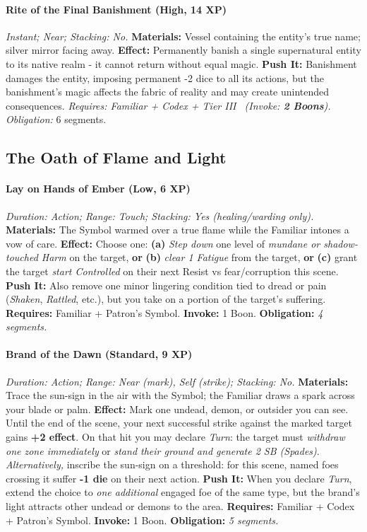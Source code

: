 \paragraph{Rite of the Final Banishment (High, 14 XP)} \emph{Instant; Near; Stacking: No.}
\textbf{Materials:} Vessel containing the entity's true name; silver mirror facing away.
\textbf{Effect:} Permanently banish a single supernatural entity to its native realm - it cannot return without equal magic.
\textbf{Push It:} Banishment damages the entity, imposing permanent -2 dice to all its actions, but the banishment's magic affects the fabric of reality and may create unintended consequences.
\emph{Requires: Familiar + Codex + Tier III \ (\textit{Invoke:} \textbf{2 Boons}).}
\emph{Obligation:} 6 segments.

\subsection*{The Oath of Flame and Light}
\paragraph{Lay on Hands of Ember (Low, 6 XP)} \emph{Duration: Action; Range: Touch; Stacking: Yes (healing/warding only).}  
\textbf{Materials:} The Symbol warmed over a true flame while the Familiar intones a vow of care.  
\textbf{Effect:} Choose one: \textbf{(a)} \emph{Step down} one level of \emph{mundane or shadow-touched Harm} on the target, \textbf{or} \textbf{(b)} \emph{clear 1 Fatigue} from the target, \textbf{or} \textbf{(c)} grant the target \emph{start Controlled} on their next Resist vs fear/corruption this scene.  
\textbf{Push It:} Also remove one minor lingering condition tied to dread or pain (\emph{Shaken}, \emph{Rattled}, etc.), but you take on a portion of the target's suffering.
\textbf{Requires:} Familiar + Patron's Symbol. \;\; \textbf{Invoke:} 1 Boon. \;\; \textbf{Obligation:} \emph{4 segments.}


\paragraph{Brand of the Dawn (Standard, 9 XP)} \emph{Duration: Action; Range: Near (mark), Self (strike); Stacking: No.}  
\textbf{Materials:} Trace the sun-sign in the air with the Symbol; the Familiar draws a spark across your blade or palm.  
\textbf{Effect:} Mark one undead, demon, or outsider you can see. Until the end of the scene, your next successful strike against the marked target gains \textbf{+2 effect}. On that hit you may declare \emph{Turn}: the target must \emph{withdraw one zone immediately} or \emph{stand their ground and generate 2 SB (Spades)}.  
\emph{Alternatively,} inscribe the sun-sign on a threshold: for this scene, named foes crossing it suffer \textbf{-1 die} on their next action.  
\textbf{Push It:} When you declare \emph{Turn}, extend the choice to \emph{one additional} engaged foe of the same type, but the brand's light attracts other undead or demons to the area.
\textbf{Requires:} Familiar + Codex + Patron's Symbol. \;\; \textbf{Invoke:} 1 Boon. \;\; \textbf{Obligation:} \emph{5 segments.}


